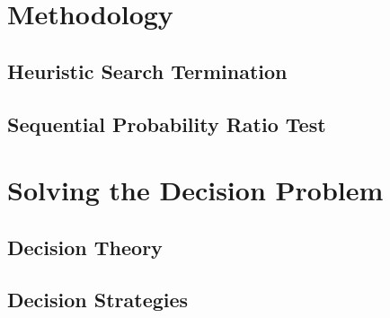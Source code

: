 \section{Methodology}


\subsection{Heuristic Search Termination}
\subsection{Sequential Probability Ratio Test}

\section{Solving the Decision Problem}

\subsection{Decision Theory}

\subsection{Decision Strategies}

